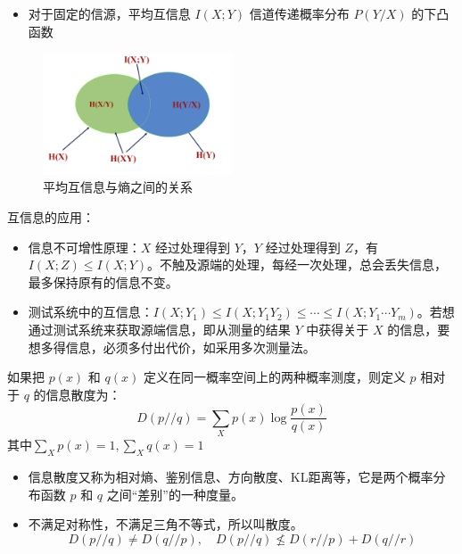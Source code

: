 \begin{remark}
\begin{itemize}
        \item 对于固定的信源，平均互信息 $I(X; Y)$ 信道传递概率分布 $P(Y / X)$ 的下凸
        函数
    \end{itemize}
    \begin{figure}[htbp]
        \centering
        \includegraphics[width=0.5\textwidth]{./figure/fig2.png}
        \caption{平均互信息与熵之间的关系}
    \end{figure}
\end{remark}

\begin{remark}
    互信息的应用：
    \begin{itemize}
        \item 信息不可增性原理：$X$ 经过处理得到 $Y$，$Y$ 经过处理得到 $Z$，有 $I(X; Z) \le I(X; Y)$。不触及源端的处理，每经一次处理，总会丢失信息，最多保持原有的信息不变。
        \item 测试系统中的互信息：$I(X; Y_1) \le I(X; Y_1Y_2) \le \cdots \le I(X; Y_1\cdots Y_m)$。若想通过测试系统来获取源端信息，即从测量的结果 $Y$ 中获得关于 $X$ 的信息，要想多得信息，必须多付出代价，如采用多次测量法。
    \end{itemize}
\end{remark}

\begin{remark}
    如果把 $p(x)$ 和 $q(x)$ 定义在同一概率空间上的两种概率测度，则定义 $p$ 相对于 $q$ 的信息散度为：\[D(p//q) = \sum_Xp(x)\log\frac{p(x)}{q(x)}\]其中$\underset{X}{\sum}p(x) = 1, \underset{X}{\sum}q(x) = 1$
    \begin{itemize}
        \item 信息散度又称为相对熵、鉴别信息、方向散度、KL距离等，它是两个概率分布函数 $p$ 和 $q$ 之间“差别”的一种度量。
        \item 不满足对称性，不满足三角不等式，所以叫散度。\[D(p//q) \neq D(q//p), \quad D(p//q) \nleq D(r//p) + D(q//r)\]
    \end{itemize}
\end{remark}

